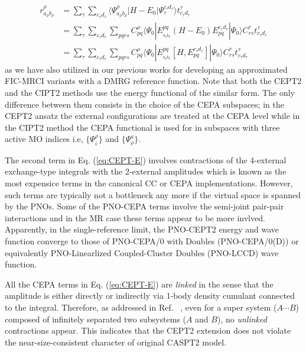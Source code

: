\documentclass[aip,jcp,amsmath]{revtex4-1}
\begin{document}
%
\begin{align}
  r_{a_\rho b_\rho}^{\rho} &= \sum_{\tau}\sum_{c_\tau d_\tau}\langle\Psi_{a_\rho b_\rho}^{\rho}|H-E_0|\Psi_{\tau}^{c_\tau d_\tau}\rangle t_{c_\tau d_\tau}^\tau \nonumber \\
  &= \sum_{\tau}\sum_{c_\tau d_\tau} \sum_{pqrs} C_{pq}^\rho \langle\Psi_0|E_{_{a_\rho b_\rho}}^{pq}(H-E_0)E_{pq}^{c_\tau d_\tau}|\Psi_0\rangle C_{rs}^\tau t_{c_\tau d_\tau}^\tau \nonumber \\
  &= \sum_{\tau}\sum_{c_\tau d_\tau} \sum_{pqrs} C_{pq}^\rho \langle\Psi_0|E_{_{a_\rho b_\rho}}^{pq}[H,E_{pq}^{c_\tau d_\tau}]|\Psi_0\rangle C_{rs}^\tau t_{c_\tau d_\tau}^\tau \label{eq:comm}
\end{align}
as we have also utilized in our previous works for developing an approximated FIC-MRCI variants with a DMRG reference function.\cite{saitowmultireference2013,doi:10.1021/acs.jctc.5b00270}
%
Note that both the CEPT2 and the CIPT2\cite{celanithe2004} methods use the energy functional of the similar form.
%
The only difference between them consists in the choice of the CEPA subspaces; in the CEPT2 ansatz the external configurations are treated at the CEPA level while in the CIPT2 method the CEPA functional is used for in subspaces with three active MO indices i.e, $\{\Psi_i^\rho\}$ and $\{\Psi_\rho^a\}$.

%
The second term in Eq. (\ref{eq:CEPT-E}) involves contractions of the 4-external exchange-type integrals with the 2-external amplitudes which is known as the most expensice terms in the canonical CC or CEPA implementations.
%
However, such terms are typically not a bottleneck any more if the virtual space is spanned by the PNOs.
%
Some of the PNO-CEPA terms involve the semi-joint pair-pair interactions and in the MR case these terms appear to be more invlved.
%
Apparently, in the single-reference limit, the PNO-CEPT2 energy and wave function converge to those of PNO-CEPA/0 with Doubles (PNO-CEPA/0(D)) or equivalently PNO-Linearlized Coupled-Cluster Doubles (PNO-LCCD) wave function.

%
All the CEPA terms in Eq. (\ref{eq:CEPT-E}) are {\it linked} in the sense that the amplitude is either directly or indirectly via 1-body density cumulant connected to the integral.
%
Therefore, as addressed in Ref. ~, even for a super system ($A\cdots B$) composed of infinitely separated two subsystems ($A$ and $B$), no {\it unlinked} contractions appear.
%
This indicates that the CEPT2 extension does not violate the near-size-consistent character of original CASPT2 model.
\end{document}
